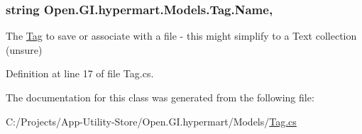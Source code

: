 \subsubsection[{Name}]{\setlength{\rightskip}{0pt plus 5cm}string Open.\+G\+I.\+hypermart.\+Models.\+Tag.\+Name\hspace{0.3cm}{\ttfamily [get]}, {\ttfamily [set]}}\label{class_open_1_1_g_i_1_1hypermart_1_1_models_1_1_tag_a9aa9f9231f2e67fc98403f5ae6be4c0c}


The \hyperlink{class_open_1_1_g_i_1_1hypermart_1_1_models_1_1_tag}{Tag} to save or associate with a file -\/ this might simplify to a Text collection (unsure) 



Definition at line 17 of file Tag.\+cs.



The documentation for this class was generated from the following file\+:\begin{DoxyCompactItemize}
\item 
C\+:/\+Projects/\+App-\/\+Utility-\/\+Store/\+Open.\+G\+I.\+hypermart/\+Models/\hyperlink{_tag_8cs}{Tag.\+cs}\end{DoxyCompactItemize}
